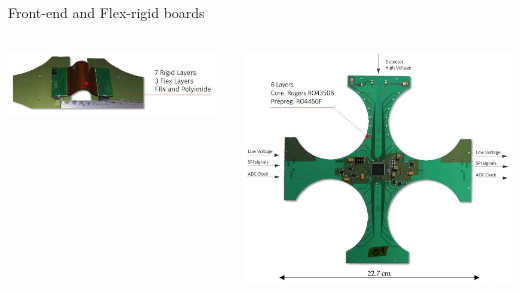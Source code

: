 \documentclass[aspectratio=169,xcolor=dvipsnames]{beamer}
\newcommand{\backupend}{
   \setcounter{framenumber}{\value{finalframe}}
}
\begin{document}
{\begin{frame}{Front-end and Flex-rigid boards}
\begin{columns}
            \centering
            \includegraphics[width=0.97\textwidth]{images/backup_slides/flex_rigid_description.jpg}
          
            \includegraphics[width=1.05\textwidth]{images/backup_slides/feb_signals.jpg}
            \vspace{-0.5cm}
            
    \end{columns}
    
\end{frame}
}

\backupend
\end{document}
